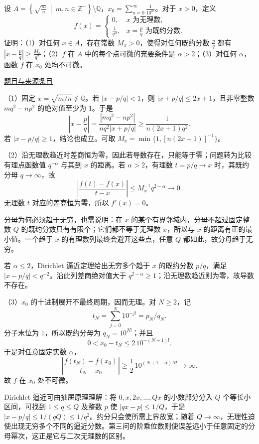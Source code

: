 \documentclass[12pt,fontset=fandol]{ctexart}
\begin{document}
\begin{example}[来源序号6]\label{ex:ch06-14th-A-makeup2:6}\label{pr:ch06-14th-A-makeup2:6}

设 $A=\left\{\sqrt{\frac{m}{n}}\ \middle|\ m,n\in\mathbb{Z}^{+}\right\}\setminus\mathbb{Q}$，$x_{0}=\sum_{n=0}^{\infty}\frac{1}{10^{n!}}$。对于 $x>0$，定义
\[
f(x)=\begin{cases}0, & x\text{ 为无理数},\\ \frac{1}{q^{\alpha}}, & x=\frac{p}{q}\text{ 为既约分数}.\end{cases}
\]
证明：（1）对任何 $x\in A$，存在常数 $M_{x}>0$，使得对任何既约分数 $\frac{p}{q}$ 都有 $\left|x-\frac{p}{q}\right|\geq\frac{M_{x}}{q^{2}}$；（2）$f$ 在 $A$ 中的每个点可微的充要条件是 $\alpha>2$；（3）对任何 $\alpha$，函数 $f$ 在 $x_{0}$ 处均不可微。

\par\href{https://github.com/lzxcr/cmc-mathematics/blob/64916fa1fdbc3e444a652eca204d5669058ee321/src/problems/preliminary/14-makeup2/06.md}{题目与来源条目}

\end{example}

\begin{solve}\label{ans:ch06-14th-A-makeup2:6}

（1）固定 $x=\sqrt{m/n}\notin\mathbb Q$。若 $|x-p/q|<1$，则 $|x+p/q|\leq2x+1$，且非零整数 $mq^2-np^2$ 的绝对值至少为 $1$。于是
\[
\left|x-\frac pq\right|
=\frac{|mq^2-np^2|}{nq^2|x+p/q|}
\geq\frac1{n(2x+1)q^2}.
\]
若 $|x-p/q|\geq1$，结论也成立。可取 $M_x=\min\{1,[n(2x+1)]^{-1}\}$。

（2）沿无理数趋近时差商恒为零，因此若导数存在，只能等于零；问题转为比较有理点函数值 $q^{-\alpha}$ 与其到 $x$ 的距离。若 $\alpha>2$，有理数 $t=p/q\to x$ 时，其既约分母 $q\to\infty$，故
\[
\left|\frac{f(t)-f(x)}{t-x}\right|
\leq M_x^{-1}q^{2-\alpha}\longrightarrow0.
\]
无理数 $t$ 对应的差商恒为零，所以 $f'(x)=0$。

分母为何必须趋于无穷，也需说明：在 $x$ 的某个有界邻域内，分母不超过固定整数 $Q$ 的既约分数只有有限个；它们都不等于无理数 $x$，所以与 $x$ 的距离有正的最小值。一个趋于 $x$ 的有理数列最终会避开这些点，任意 $Q$ 都如此，故分母趋于无穷。

若 $\alpha\leq2$，Dirichlet 逼近定理给出无穷多个趋于 $x$ 的既约分数 $p/q$，满足 $|x-p/q|<q^{-2}$。沿此列差商绝对值大于 $q^{2-\alpha}\geq1$；沿无理数趋近则为零，故导数不存在。

（3）$x_0$ 的十进制展开不最终周期，因而无理。对 $N\geq2$，记
\[
t_N=\sum_{j=0}^N10^{-j!}=p_N/q_N.
\]
分子末位为 $1$，所以既约分母为 $q_N=10^{N!}$；并且
\[
0<x_0-t_N\leq2\,10^{-(N+1)!}.
\]
于是对任意固定实数 $\alpha$，
\[
\left|\frac{f(t_N)-f(x_0)}{t_N-x_0}\right|
\geq\frac12\,10^{(N+1-\alpha)N!}\longrightarrow\infty.
\]
故 $f$ 在 $x_0$ 处不可微。

Dirichlet 逼近可由抽屉原理理解：将 $0,x,2x,\ldots,Qx$ 的小数部分分入 $Q$ 个等长小区间，可找到 $1\le q\le Q$ 及整数 $p$ 使 $|qx-p|\le1/Q$，于是 $|x-p/q|\le1/(qQ)\le1/q^2$。约分只会使所需上界放宽；随着 $Q\to\infty$，无理性迫使出现无穷多个不同的逼近分数。第三问的阶乘位数则使误差远小于任意固定的分母幂次，这正是它与二次无理数的区别。

\end{solve}
\end{document}
